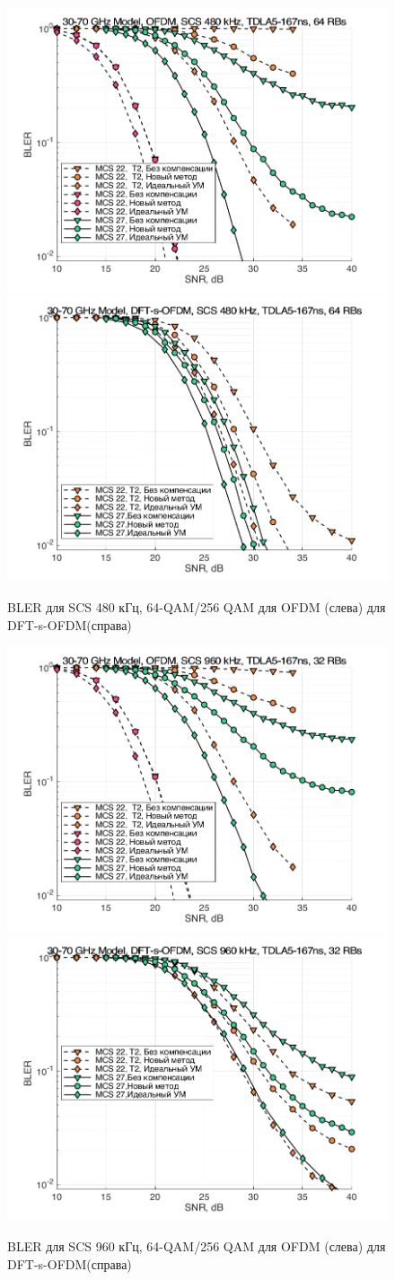 \begin{figure}[h!]
    \centering
    \includegraphics[width=0.49\linewidth]{figs/res/ofdm/OFDM_Nokia_SCS480_MCS22_27.png}
    \includegraphics[width=0.49\linewidth]{figs/res/dftsofdm/DFT-s-OFDM_Nokia_SCS480_MCS22_27.png}
    \caption{BLER для SCS 480 кГц, 64-QAM/256 QAM для OFDM (слева) для DFT-s-OFDM(справа)}
    \label{fig:res3070_scs480}
\end{figure}

\begin{figure}[h!]
    \centering
    \includegraphics[width=0.49\linewidth]{figs/res/ofdm/OFDM_Nokia_SCS960_MCS22_27.png}
    \includegraphics[width=0.49\linewidth]{figs/res/dftsofdm/DFT-s-OFDM_Nokia_SCS960_MCS22_27.png}
    \caption{BLER для SCS 960 кГц, 64-QAM/256 QAM для OFDM (слева) для DFT-s-OFDM(справа)}
    \label{fig:res3070_scs960}
\end{figure}

